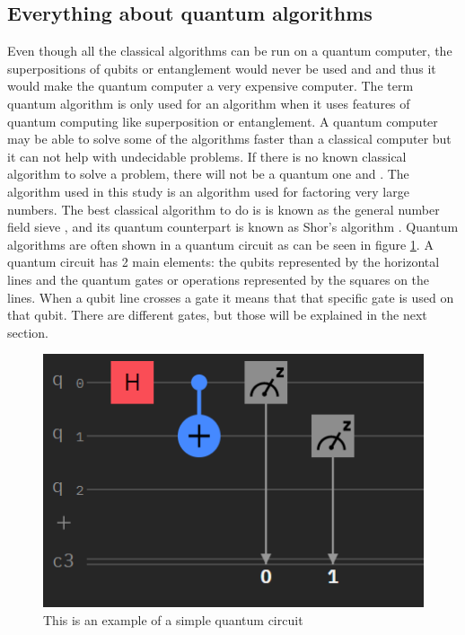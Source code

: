 \subsection{Everything about quantum algorithms}
Even though all the classical algorithms can be run on a quantum computer, the superpositions of qubits or entanglement would never be used \autocite{qalgo} and \autocite{quantumalgo} and thus it would make the quantum computer a very expensive computer.
The term quantum algorithm is only used for an algorithm when it uses features of quantum computing like superposition or entanglement.
A quantum computer may be able to solve some of the algorithms faster than a classical computer but it can not help with undecidable problems. If there is no known classical algorithm to solve a problem, there will not be a quantum one \autocite{undecidable} and \autocite{quantumalgo}.
The algorithm used in this study is an algorithm used for factoring very large numbers. The best classical algorithm to do is is known as the general number field sieve \autocite{GNFS}, and its quantum counterpart is known as Shor's algorithm \autocite{Shor}.
Quantum algorithms are often shown in a quantum circuit as can be seen in figure \ref{fig:Quantum circuit}. A quantum circuit has 2 main elements: the qubits represented by the horizontal lines and the quantum gates or operations represented by the squares on the lines.
When a qubit line crosses a gate it means that that specific gate is used on that qubit. There are different gates, but those will be explained in the next section.

\begin{figure} [h]
    \centering
    \includegraphics[width=\textwidth]{img/circuitVB.PNG}
        \caption{This is an example of a simple quantum circuit}
        \label{fig:Quantum circuit}
\end{figure}

